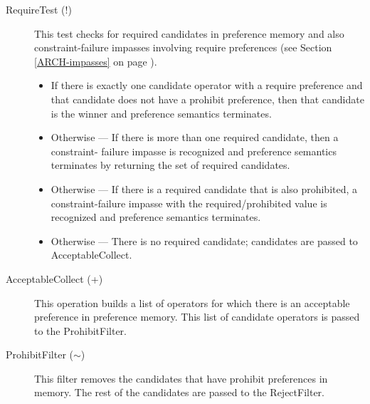 \begin{description}
	\item[RequireTest (!)]
		This test checks for required candidates in preference memory and also constraint-failure impasses involving require preferences (see Section \ref{ARCH-impasses} on page \pageref{ARCH-impasses}).

	\begin{itemize}
		\item If there is exactly one candidate operator with a require preference and
		that candidate does not have a prohibit preference, then that candidate
		is the winner and preference semantics terminates.
		\item Otherwise ---
		If there is more than one required candidate, then a constraint-
		failure impasse is recognized and preference semantics terminates
		by returning the set of required candidates.
		\item Otherwise ---
		If there is a required candidate that is also prohibited, a
		constraint-failure impasse with the required/prohibited value is
		recognized and preference semantics terminates.
		\item Otherwise ---
		There is no required candidate; candidates are passed to AcceptableCollect.
	\end{itemize}

	\index{+}
	\item[AcceptableCollect (+) ]
		This operation builds a list of operators for which there is an acceptable preference in preference memory. This list of candidate operators is passed to the ProhibitFilter.

	\item[ProhibitFilter ($\sim$) ] This filter removes the candidates that have prohibit preferences in memory. The rest of the candidates are passed to the RejectFilter.


\end{description}

